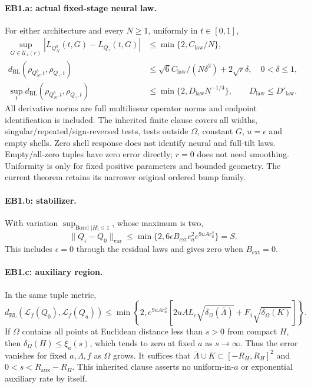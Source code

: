 \paragraph{EB1.a: actual fixed-stage neural law.}
For either architecture and every $N\ge1$, uniformly in $t\in[0,1]$,
\begin{align*}
 \sup_{G\in\mathcal U_4(r)}|L_{Q_N^b}(t,G)-L_{Q_\gamma}(t,G)|
 &\le\min\{2,C_{\mathrm{law}}/N\},\\
 d_{\mathrm{BL}}(\rho_{Q_N^b,t},\rho_{Q_\gamma,t})
 &\le\sqrt6C_{\mathrm{law}}/(N\delta^3)+2\sqrt r\delta,
 \quad0<\delta\le1,\\
 \sup_t d_{\mathrm{BL}}(\rho_{Q_N^b,t},\rho_{Q_\gamma,t})
 &\le\min\{2,D_{\mathrm{law}}N^{-1/4}\},\qquad
 D_{\mathrm{law}}\le D'_{\mathrm{law}}.
\end{align*}
All derivative norms are full multilinear operator norms and endpoint
identification is included. The inherited finite clause covers all widths,
singular/repeated/sign-reversed tests, tests outside $\Omega$, constant $G$,
$u=\epsilon$ and empty shells. Zero shell response does not identify neural
and full-tilt laws. Empty/all-zero tuples have zero error directly; $r=0$
does not need smoothing. Uniformity is only for fixed positive parameters
and bounded geometry. The current theorem retains its narrower original
ordered bump family.

\paragraph{EB1.b: stabilizer.}
With variation $\sup_{\text{Borel }|H|\le1}$, whose maximum is two,
\[
 \|Q_\epsilon-Q_0\|_{\mathrm{var}}
 \le\min\{2,6\epsilon B_{\mathrm{ext}}c_a^2e^{9uAc_a^2}\}=S.
\]
This includes $\epsilon=0$ through the residual laws and gives zero when
$B_{\mathrm{ext}}=0$.

\paragraph{EB1.c: auxiliary region.}
In the same tuple metric,
\[
 d_{\mathrm{BL}}(\mathcal L_f(Q_0),\mathcal L_f(Q_a))
 \le\min\left\{2,e^{9uAc_a^2}
 [2uAL_c\sqrt{\delta_\Omega(\overline\Lambda)}
                         +F_1\sqrt{\delta_\Omega(K)}]\right\}.
\]
If $\Omega$ contains all points at Euclidean distance less than $s>0$
from compact $H$, then $\delta_\Omega(H)\le\xi_a(s)$, which tends to
zero at fixed $a$ as $s\to\infty$. Thus the error vanishes for fixed
$a,\Lambda,f$ as $\Omega$ grows. It suffices that
$\overline\Lambda\cup K\subset[-R_H,R_H]^2$ and
$0<s<R_{\mathrm{aux}}-R_H$. This inherited clause asserts no
uniform-in-$a$ or exponential auxiliary rate by itself.

